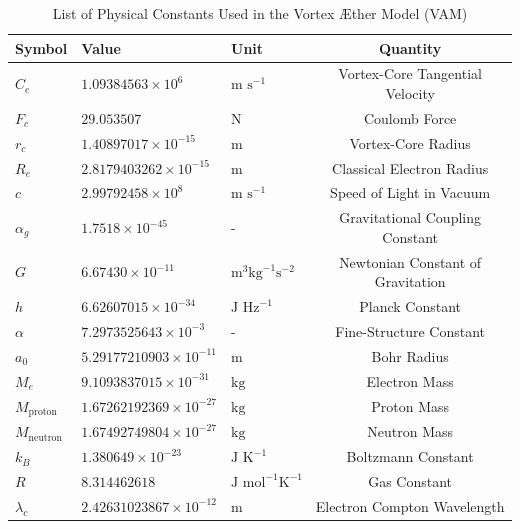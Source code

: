 \documentclass[a4paper,10pt]{article}
\begin{document}
    \begin{table}[h]
        \centering
        \renewcommand{\arraystretch}{1.2}
        \begin{tabular}{lllc}
            \toprule
            \textbf{Symbol} & \textbf{Value} & \textbf{Unit} & \textbf{Quantity} \\
            \midrule
            $C_e$ & $1.09384563 \times 10^6$ & $\text{m s}^{-1}$ & Vortex-Core Tangential Velocity \\
            $F_c$ & $29.053507$ & $\text{N}$ & Coulomb Force \\
            $r_c$ & $1.40897017 \times 10^{-15}$ & $\text{m}$ & Vortex-Core Radius \\
            $R_e$ & $2.8179403262 \times 10^{-15}$ & $\text{m}$ & Classical Electron Radius \\
            $c$ & $2.99792458 \times 10^8$ & $\text{m s}^{-1}$ & Speed of Light in Vacuum \\
            $\alpha_g$ & $1.7518 \times 10^{-45}$ & - & Gravitational Coupling Constant \\
            $G$ & $6.67430 \times 10^{-11}$ & $\text{m}^3 \text{kg}^{-1} \text{s}^{-2}$ & Newtonian Constant of Gravitation \\
            $h$ & $6.62607015 \times 10^{-34}$ & $\text{J Hz}^{-1}$ & Planck Constant \\
            $\alpha$ & $7.2973525643 \times 10^{-3}$ & - & Fine-Structure Constant \\
            $a_0$ & $5.29177210903 \times 10^{-11}$ & $\text{m}$ & Bohr Radius \\
            $M_e$ & $9.1093837015 \times 10^{-31}$ & $\text{kg}$ & Electron Mass \\
            $M_{\text{proton}}$ & $1.67262192369 \times 10^{-27}$ & $\text{kg}$ & Proton Mass \\
            $M_{\text{neutron}}$ & $1.67492749804 \times 10^{-27}$ & $\text{kg}$ & Neutron Mass \\
            $k_B$ & $1.380649 \times 10^{-23}$ & $\text{J K}^{-1}$ & Boltzmann Constant \\
            $R$ & $8.314462618$ & $\text{J mol}^{-1} \text{K}^{-1}$ & Gas Constant \\
            $\lambda_c$ & $2.42631023867 \times 10^{-12}$ & $\text{m}$ & Electron Compton Wavelength \\
            \bottomrule
        \end{tabular}
        \caption{List of Physical Constants Used in the Vortex \AE ther Model (VAM)}
        \label{tab:vam_constants}
    \end{table}
\end{document}
